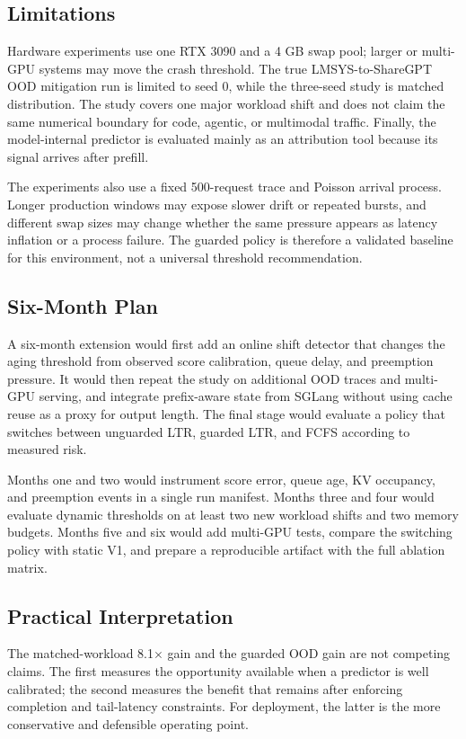 \documentclass[conference]{IEEEtran}
\begin{document}
\subsection{Limitations}
Hardware experiments use one RTX 3090 and a 4 GB swap pool; larger or multi-GPU systems may move the crash threshold. The true LMSYS-to-ShareGPT OOD mitigation run is limited to seed 0, while the three-seed study is matched distribution. The study covers one major workload shift and does not claim the same numerical boundary for code, agentic, or multimodal traffic. Finally, the model-internal predictor is evaluated mainly as an attribution tool because its signal arrives after prefill.

The experiments also use a fixed 500-request trace and Poisson arrival process. Longer production windows may expose slower drift or repeated bursts, and different swap sizes may change whether the same pressure appears as latency inflation or a process failure. The guarded policy is therefore a validated baseline for this environment, not a universal threshold recommendation.

\subsection{Six-Month Plan}
A six-month extension would first add an online shift detector that changes the aging threshold from observed score calibration, queue delay, and preemption pressure. It would then repeat the study on additional OOD traces and multi-GPU serving, and integrate prefix-aware state from SGLang without using cache reuse as a proxy for output length. The final stage would evaluate a policy that switches between unguarded LTR, guarded LTR, and FCFS according to measured risk.

Months one and two would instrument score error, queue age, KV occupancy, and preemption events in a single run manifest. Months three and four would evaluate dynamic thresholds on at least two new workload shifts and two memory budgets. Months five and six would add multi-GPU tests, compare the switching policy with static V1, and prepare a reproducible artifact with the full ablation matrix.

\subsection{Practical Interpretation}
The matched-workload 8.1$\times$ gain and the guarded OOD gain are not competing claims. The first measures the opportunity available when a predictor is well calibrated; the second measures the benefit that remains after enforcing completion and tail-latency constraints. For deployment, the latter is the more conservative and defensible operating point.
\end{document}
